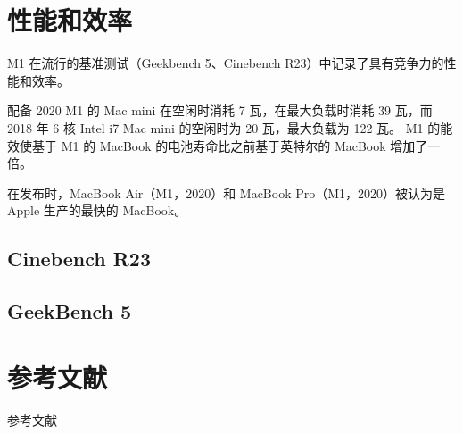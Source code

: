 \documentclass[a4paper]{article}
\begin{document}
\section{性能和效率}

M1 在流行的基准测试（Geekbench 5、Cinebench R23）中记录了具有竞争力的性能和效率。

配备 2020 M1 的 Mac mini 在空闲时消耗 7 瓦，在最大负载时消耗 39 瓦，而 2018 年 6 核 Intel i7 Mac mini 的空闲时为 20 瓦，最大负载为 122 瓦。 M1 的能效使基于 M1 的 MacBook 的电池寿命比之前基于英特尔的 MacBook 增加了一倍。

在发布时，MacBook Air（M1，2020）和 MacBook Pro（M1，2020）被认为是 Apple 生产的最快的 MacBook。

\subsection{Cinebench R23}

\subsection{GeekBench 5}


\section{参考文献}
参考文献\cite{quinn1994parallel}\cite{golub2014scientific}\cite{joseph2022parallel}

\newpage


\end{document}
